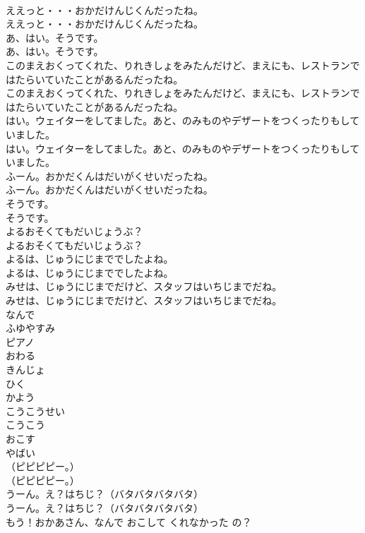 \documentclass[8pt]{extreport}
\begin{document}
\begin{CJK}{UTF8}{min}
\\	ええっと・・・おかだけんじくんだったね。	
\\	ええっと・・・おかだけんじくんだったね。 
\\	あ、はい。そうです。	
\\	あ、はい。そうです。 
\\	このまえおくってくれた、りれきしょをみたんだけど、まえにも、レストランではたらいていたことがあるんだったね。	
\\	このまえおくってくれた、りれきしょをみたんだけど、まえにも、レストランではたらいていたことがあるんだったね。 
\\	はい。ウェイターをしてました。あと、のみものやデザートをつくったりもしていました。	
\\	はい。ウェイターをしてました。あと、のみものやデザートをつくったりもしていました。 
\\	ふーん。おかだくんはだいがくせいだったね。	
\\	ふーん。おかだくんはだいがくせいだったね。 
\\	そうです。	
\\	そうです。 
\\	よるおそくてもだいじょうぶ？	
\\	よるおそくてもだいじょうぶ？ 
\\	よるは、じゅうにじまででしたよね。	
\\	よるは、じゅうにじまででしたよね。 
\\	みせは、じゅうにじまでだけど、スタッフはいちじまでだね。	
\\	みせは、じゅうにじまでだけど、スタッフはいちじまでだね。 
\\	なんで
\\	ふゆやすみ
\\	ピアノ
\\	おわる
\\	きんじょ
\\	ひく
\\	かよう
\\	こうこうせい
\\	こうこう
\\	おこす
\\	やばい
\\	（ピピピピー。）	
\\	（ピピピピー。） 
\\	うーん。え？はちじ？（バタバタバタバタ）	
\\	うーん。え？はちじ？（バタバタバタバタ） 
\\	もう！おかあさん、なんで おこして くれなかった の？	

\end{CJK}
\end{document}
